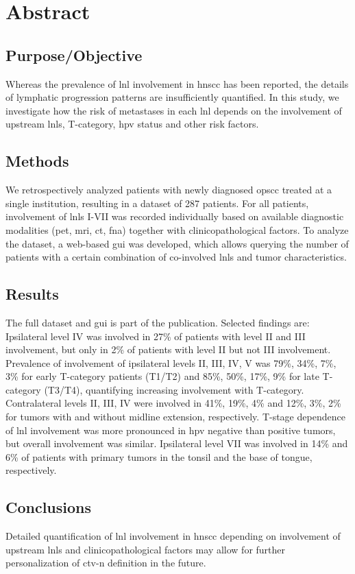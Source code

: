 \documentclass[\relativeRoot/main.tex]{subfiles}
\begin{document}
\section{Abstract}
\label{sec:dataset_usz:asbtract}

\subsection*{Purpose/Objective}

Whereas the prevalence of \gls{lnl} involvement in \gls{hnscc} has been reported, the details of lymphatic progression patterns are insufficiently quantified. In this study, we investigate how the risk of metastases in each \gls{lnl} depends on the involvement of upstream \glspl{lnl}, T-category, \gls{hpv} status and other risk factors.

\subsection*{Methods}

We retrospectively analyzed patients with newly diagnosed \gls{opscc} treated at a single institution, resulting in a dataset of 287 patients. For all patients, involvement of \glspl{lnl} I-VII was recorded individually based on available diagnostic modalities (\gls{pet}, \gls{mri}, \gls{ct}, \gls{fna}) together with clinicopathological factors. To analyze the dataset, a web-based \gls{gui} was developed, which allows querying the number of patients with a certain combination of co-involved \glspl{lnl} and tumor characteristics.

\subsection*{Results}

The full dataset and \gls{gui} is part of the publication. Selected findings are: Ipsilateral level IV was involved in 27\% of patients with level II and III involvement, but only in 2\% of patients with level II but not III involvement. Prevalence of involvement of ipsilateral levels II, III, IV, V was 79\%, 34\%, 7\%, 3\% for early T-category patients (T1/T2) and 85\%, 50\%, 17\%, 9\% for late T-category (T3/T4), quantifying increasing involvement with T-category. Contralateral levels II, III, IV were involved in 41\%, 19\%, 4\% and 12\%, 3\%, 2\% for tumors with and without midline extension, respectively. T-stage dependence of \gls{lnl} involvement was more pronounced in \gls{hpv} negative than positive tumors, but overall involvement was similar. Ipsilateral level VII was involved in 14\% and 6\% of patients with primary tumors in the tonsil and the base of tongue, respectively.

\subsection*{Conclusions}

Detailed quantification of \gls{lnl} involvement in \gls{hnscc} depending on involvement of upstream \glspl{lnl} and clinicopathological factors may allow for further personalization of \gls{ctv-n} definition in the future.
\end{document}
